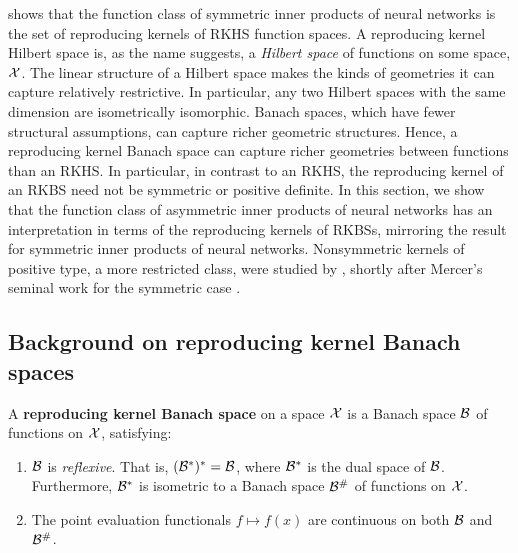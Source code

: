  shows that the function class of symmetric inner products of neural networks is the set of reproducing kernels of RKHS function spaces. A reproducing kernel Hilbert space is, as the name suggests, a \textit{Hilbert space} of functions on some space, ${\mathcal{X}}$. The linear structure of a Hilbert space makes the kinds of geometries it can capture relatively restrictive. In particular, any two Hilbert spaces with the same dimension are isometrically isomorphic. Banach spaces, which have fewer structural assumptions, can capture richer geometric structures. Hence, a reproducing kernel Banach space can capture richer geometries between functions than an RKHS. In particular, in contrast to an RKHS, the reproducing kernel of an RKBS need not be symmetric or positive definite. In this section, we show that the function class of asymmetric inner products of neural networks has an interpretation in terms of the reproducing kernels of RKBSs, mirroring the result for symmetric inner products of neural networks. Nonsymmetric kernels of positive type, a more restricted class, were studied by \citet{seelyNonSymmetricKernels1919}, shortly after Mercer's seminal work for the symmetric case \citep{mercerFunctionsPositive1909}.

\subsection{Background on reproducing kernel Banach spaces}

\begin{definition}
    A \textbf{reproducing kernel Banach space} on a space ${\mathcal{X}}$ is a Banach space ${\mathcal{B}}$ of functions on ${\mathcal{X}}$, satisfying:
    \begin{enumerate}
        \item ${\mathcal{B}}$ is \textit{reflexive}. That is, $({\mathcal{B}}^*)^* = {\mathcal{B}}$, where ${\mathcal{B}}^*$ is the dual space of ${\mathcal{B}}$. Furthermore, ${\mathcal{B}}^*$ is isometric to a Banach space ${\mathcal{B}}^\#$ of functions on ${\mathcal{X}}$.
        \item The point evaluation functionals $f \mapsto f(x)$ are continuous on both ${\mathcal{B}}$ and ${\mathcal{B}}^\#$.
    \end{enumerate}
\end{definition}


